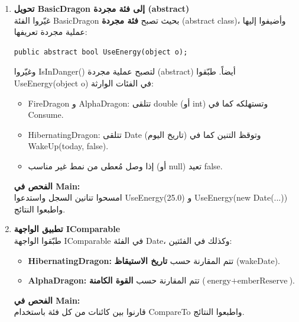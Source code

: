 \documentclass[14pt]{extarticle}
\begin{document}
\begin{enumerate}[resume, label=\textbf{تمرين \arabic*:}, wide=0pt, leftmargin=*, itemsep=2.2em]

    \item \textbf{تحويل \textenglish{BasicDragon} إلى فئة مجردة (\textenglish{abstract})} \\
    غيّروا الفئة \textenglish{BasicDragon} بحيث تصبح \textbf{فئة مجردة} (\textenglish{abstract class})، وأضيفوا إليها عملية مجردة تعريفها:
    \begin{boxCode}
    \begin{english}
    \begin{verbatim}
public abstract bool UseEnergy(object o);
    \end{verbatim}
    \end{english}
    \end{boxCode}
    وغيّروا \textenglish{IsInDanger()} لتصبح عملية مجردة (\textenglish{abstract}) أيضاً. طبّقوا \textenglish{UseEnergy(object o)} في الفئات الوارثة:
    \begin{itemize}
        \item \textenglish{FireDragon} و \textenglish{AlphaDragon}: تتلقى \textenglish{double} (أو \textenglish{int}) وتستهلكه كما في \textenglish{Consume}.
        \item \textenglish{HibernatingDragon}: تتلقى \textenglish{Date} (تاريخ اليوم) وتوقظ التنين كما في \textenglish{WakeUp(today, false)}.
        \item إذا وصل مُعطى من نمط غير مناسب (أو \textenglish{null}) تعيد \textenglish{false}.
    \end{itemize}
    \textbf{الفحص في \textenglish{Main}:} \\
    امسحوا تنانين السجل واستدعوا \textenglish{UseEnergy(25.0)} و \textenglish{UseEnergy(new Date(...))} واطبعوا النتائج.

    \item \textbf{تطبيق الواجهة \textenglish{IComparable}} \\
    طبّقوا الواجهة \textenglish{IComparable} في الفئة \textenglish{Date}، وكذلك في الفئتين:
    \begin{itemize}
        \item \textbf{\textenglish{HibernatingDragon}:} تتم المقارنة حسب \textbf{تاريخ الاستيقاظ} (\textenglish{wakeDate}).
        \item \textbf{\textenglish{AlphaDragon}:} تتم المقارنة حسب \textbf{القوة الكامنة} ($\text{energy} + \text{emberReserve}$).
    \end{itemize}
    \textbf{الفحص في \textenglish{Main}:} \\
    قارنوا بين كائنات من كل فئة باستخدام \textenglish{CompareTo} واطبعوا النتائج.


\end{enumerate}
\end{document}
